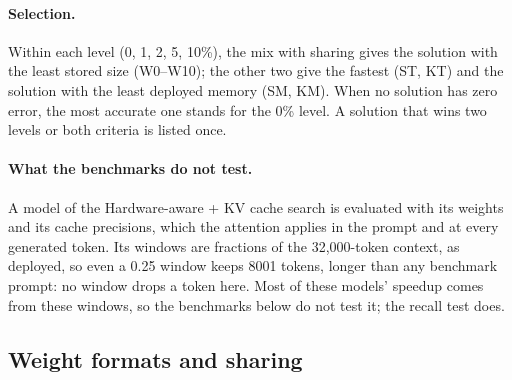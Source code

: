 \documentclass[11pt]{article}
\begin{document}
\paragraph{Selection.} Within each level (0, 1, 2, 5, 10\%), the mix with sharing gives the solution with
the least stored size (W0--W10); the other two give the fastest (ST, KT) and the solution with the least
deployed memory (SM, KM). When no solution has zero error, the most accurate one stands for the 0\% level. A
solution that wins two levels or both criteria is listed once.

\paragraph{What the benchmarks do not test.} A model of the Hardware-aware + KV cache search is evaluated with its weights and its cache
precisions, which the attention applies in the prompt and at every generated token. Its windows are
fractions of the 32{,}000-token context, as deployed, so even a 0.25 window keeps 8001 tokens, longer
than any benchmark prompt: no window drops a token here. Most of these models' speedup comes from these
windows, so the benchmarks below do not test it; the recall test does.

\subsection{Weight formats and sharing}
\end{document}
